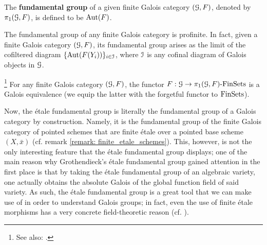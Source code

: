             \begin{definition} \label{def: fundamental_groups_of_finite_galois_categories}
                The \textbf{fundamental group} of a given finite Galois category $(\mathcal{G}, F)$, denoted by $\pi_1(\mathcal{G}, F)$, is defined to be $\mathrm{Aut}(F)$.
            \end{definition}
            \begin{proposition} \label{prop: fundamental_groups_of_finite_galois_categories_are_profinite}
                The fundamental group of any finite Galois category is profinite. In fact, given a finite Galois category $(\mathcal{G}, F)$, its fundamental group arises as the limit of the cofiltered diagram $\{\mathrm{Aut}(F(Y_i))\}_{i \in \mathcal{I}}$, where $\mathcal{I}$ is any cofinal diagram of Galois objects in $\mathcal{G}$.
            \end{proposition}
            \begin{proposition} \label{prop: finite_categorical_galois_correspondence}
                \footnote{See also: \cite[\href{https://stacks.math.columbia.edu/tag/0BN4}{Tag 0BN4}]{stacks}.}\cite[Theorem 1.1.1]{MATH525_covering_spaces_and_fundamental_group_project} For any finite Galois category $(\mathcal{G}, F)$, the functor $F: \mathcal{G} \to \pi_1(\mathcal{G}, F)\text{-}\mathrm{Fin}\mathrm{Sets}$ is a Galois equivalence (we equip the latter with the forgetful functor to $\mathrm{Fin}\mathrm{Sets}$).
            \end{proposition}
            
            Now, the \'etale fundamental group is literally the fundamental group of a Galois category by construction. Namely, it is the fundamental group of the finite Galois category of pointed schemes that are finite \'etale over a pointed base scheme $(X, \bar{x})$ (cf. remark \ref{remark: finite_etale_schemes}). This, however, is not the only interesting feature that the \'etale fundamental group displays; one of the main reason why Grothendieck's \'etale fundamental group gained attention in the first place is that by taking the \'etale fundamental group of an algebraic variety, one actually obtains the absolute Galois of the global function field of said variety. As such, the \'etale fundamental group is a great tool that we can make use of in order to understand Galois groups; in fact, even the use of finite \'etale morphisms has a very concrete field-theoretic reason (cf. \cite[\href{https://stacks.math.columbia.edu/tag/00U3}{Tag 00U3}]{stacks}).
            
